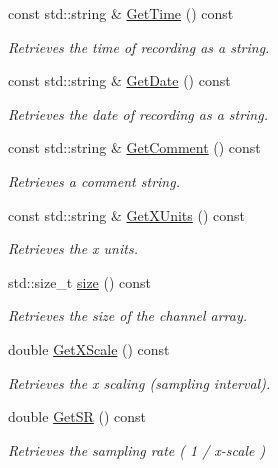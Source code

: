 \begin{DoxyCompactItemize}
const std::string \& \hyperlink{classRecording_a9ace50171c2e433cea86c52500fd7d13}{GetTime} () const 
\begin{DoxyCompactList}\small\item\em Retrieves the time of recording as a string. \item\end{DoxyCompactList}\item 
const std::string \& \hyperlink{classRecording_a379e654d9603b4fa304dadb1f3f7e7db}{GetDate} () const 
\begin{DoxyCompactList}\small\item\em Retrieves the date of recording as a string. \item\end{DoxyCompactList}\item 
const std::string \& \hyperlink{classRecording_a7ab947f6584fc5e4a07074fca60b9be9}{GetComment} () const 
\begin{DoxyCompactList}\small\item\em Retrieves a comment string. \item\end{DoxyCompactList}\item 
const std::string \& \hyperlink{classRecording_a2de7ff0583d303bfe88d19864d924750}{GetXUnits} () const 
\begin{DoxyCompactList}\small\item\em Retrieves the x units. \item\end{DoxyCompactList}\item 
std::size\_\-t \hyperlink{classRecording_ae85d90e4ab8508aa23649a168ccb0115}{size} () const 
\begin{DoxyCompactList}\small\item\em Retrieves the size of the channel array. \item\end{DoxyCompactList}\item 
double \hyperlink{classRecording_a7c68162cb02488225eb99ddb9a422917}{GetXScale} () const 
\begin{DoxyCompactList}\small\item\em Retrieves the x scaling (sampling interval). \item\end{DoxyCompactList}\item 
double \hyperlink{classRecording_a077940a80024c2107c157864f957c432}{GetSR} () const 
\begin{DoxyCompactList}\small\item\em Retrieves the sampling rate ( 1 / x-\/scale ) \item\end{DoxyCompactList}\item 

\end{DoxyCompactItemize}
